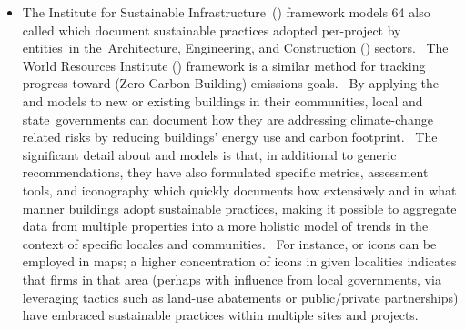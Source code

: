 \documentclass[10.5pt]{article}
\begin{document}
{{\begin{itemize}
 
\item{} The Institute for Sustainable Infrastructure (\ISI{})  framework models 64  also called  which document sustainable practices adopted per-project by entities in the Architecture, Engineering, and Construction (\AEC{}) sectors.  The World Resources Institute (\WRI{})  framework is a similar method for tracking progress toward \ZCB{} (Zero-Carbon Building) emissions goals.  By applying the \ISI{} and \WRI{} models to new or existing buildings in their communities, local and state governments can document how they are addressing climate-change related risks by reducing buildings' energy use and carbon footprint.  The significant detail about \ISI{} and \WRI{} models is that, in additional to generic  recommendations, they have also formulated specific metrics, assessment tools, and iconography which quickly documents how extensively and in what manner buildings adopt sustainable practices, making it possible to aggregate data from multiple properties into a more holistic model of trends in the context of specific locales and communities.  For instance, \ISI{} or \WRI{} icons can be employed in \GIS{} maps; a higher concentration of icons in given localities indicates that \AEC{} firms in that area (perhaps with influence from local governments, via leveraging tactics such as land-use abatements or public/private partnerships) have embraced sustainable practices within multiple sites and projects.   

\end{itemize}
}

}
\end{document}
